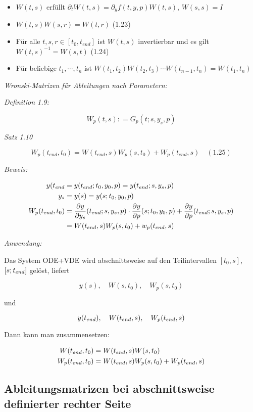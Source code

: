 \begin{itemize}
\item $W(t,s)$ erfüllt $\partial_t W(t,s) = \partial_y f(t,y,p) W(t,s)$, $W(s,s) = I$ 
\item $W(t,s) W(s,r) = W(t,r)$ (1.23)
\item Für alle $t,s,r \in [t_0, t_{end}]$ ist $W(t,s)$ invertierbar und es gilt $W(t,s)^{-1} = W(s,t)$ (1.24)
\item Für beliebige $t_1,\cdots,t_n$ ist $W(t_1,t_2)W(t_2,t_3) \cdots W(t_{n-1}, t_n) = W(t_1, t_n)$
\end{itemize}

\emph{Wronski-Matrizen für Ableitungen nach Parametern:}

\emph{Definition 1.9:}

\[ W_p(t,s) \colon= G_p(t;s,y_s,p)\]

\emph{Satz 1.10}

\[ W_p(t_{end},t_0) = W(t_{end},s) W_p(s,t_0)+W_p(t_{end},s) \quad (1.25) \]

\emph{Beweis:}

\begin{align*}
y(t_{end} &= y(t_{end}; t_0, y_0, p) = y(t_{end};s,y_s,p) \\
y_s &= y(s) = y(s; t_0,y_0,p) \\
W_p(t_{end},t_0) &= \frac{\partial y}{\partial y_s}(t_{end}; s,y_s,p) \cdot \frac{\partial y}{\partial p} (s;t_0,y_0,p) +\frac{\partial y}{\partial p}(t_{end}; s,y_s,p)\\
&= W(t_{end},s) W_p(s,t_0) + w_p(t_{end},s)
\end{align*}

\emph{Anwendung:}

Das System ODE+VDE wird abschnittsweise auf den Teilintervallen $[t_0,s]$, $[s;t_{end}]$ gelöst, liefert

\[y(s),\quad W(s,t_0), \quad W_p(s,t_0) \]

und

\[ y(t_{end}), \quad W(t_{end},s), \quad W_p(t_{end},s)\]

Dann kann man zusammensetzen:

\begin{align*}
W(t_{end},t_0) &= W(t_{end}, s) W(s,t_0) \\
W_p(t_{end},t_0) &= W(t_{end}, s) W_p(s,t_0) + W_p(t_{end}, s) 
\end{align*}

\subsection*{Ableitungsmatrizen bei abschnittsweise definierter rechter Seite}

